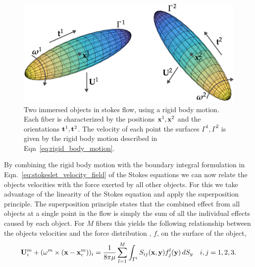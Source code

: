 \begin{figure}[!htbp]
  \centering
  \includegraphics[width=.8\textwidth]{img/immersed_rigid.png}
  \caption[Two immersed objects in stokes flow.]{Two immersed objects in stokes flow, using a rigid body motion. Each fiber is characterized by the positions $\mathbf{x}^1, \mathbf{x}^2$ and the orientations $\mathbf{t}^1,\mathbf{t}^2$. The velocity of each point the surfaces $\Gamma^1, \Gamma^2$ is given by the rigid body motion described in Eqn~\eqref{eq:rigid_body_motion}.}
  \label{fig:immersed_rigid}
\end{figure}

By combining the rigid body motion with the boundary integral formulation in Eqn.~\eqref{eq:stokeslet_velocity_field} of the Stokes equations we can now relate the objects velocities with the force exerted by all other objects. For this we take advantage of the linearity of the Stokes equation and apply the superposition principle. The superposition principle states that the combined effect from all objects at a single point in the flow is simply the sum of all the individual effects caused by each object. For $M$ fibers this yields the following relationship between the objects velocities and the force distribution , $f$, on the surface of the object,
\begin{equation}
  \label{eq:objects_boundary}
	\mathbf{U}_i^m + (\mathbf{\omega}^m \times (\mathbf{x} - \mathbf{x}_c^m))_i = \frac{1}{8 \pi \mu} \sum_{l=1}^{M} \int_{\Gamma^l} S_{ij}(\mathbf{x},\mathbf{y})f_j^l(\mathbf{y}) \, dS_y \quad i,j =1,2,3 \text{.}
\end{equation}

